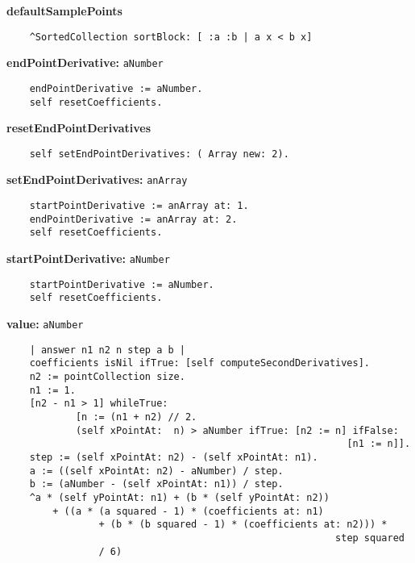 {\bf defaultSamplePoints}
\begin{verbatim}
    ^SortedCollection sortBlock: [ :a :b | a x < b x]

\end{verbatim}
{\bf endPointDerivative:} {\tt aNumber}
\begin{verbatim}
    endPointDerivative := aNumber.
    self resetCoefficients.

\end{verbatim}
{\bf resetEndPointDerivatives}
\begin{verbatim}
    self setEndPointDerivatives: ( Array new: 2).

\end{verbatim}
{\bf setEndPointDerivatives:} {\tt anArray}
\begin{verbatim}
    startPointDerivative := anArray at: 1.
    endPointDerivative := anArray at: 2.
    self resetCoefficients.

\end{verbatim}
{\bf startPointDerivative:} {\tt aNumber}
\begin{verbatim}
    startPointDerivative := aNumber.
    self resetCoefficients.

\end{verbatim}
{\bf value:} {\tt aNumber}
\begin{verbatim}
    | answer n1 n2 n step a b |
    coefficients isNil ifTrue: [self computeSecondDerivatives].
    n2 := pointCollection size.
    n1 := 1.
    [n2 - n1 > 1] whileTrue: 
            [n := (n1 + n2) // 2.
            (self xPointAt:  n) > aNumber ifTrue: [n2 := n] ifFalse: 
                                                           [n1 := n]].
    step := (self xPointAt: n2) - (self xPointAt: n1).
    a := ((self xPointAt: n2) - aNumber) / step.
    b := (aNumber - (self xPointAt: n1)) / step.
    ^a * (self yPointAt: n1) + (b * (self yPointAt: n2)) 
        + ((a * (a squared - 1) * (coefficients at: n1) 
                + (b * (b squared - 1) * (coefficients at: n2))) * 
                                                         step squared 
                / 6)

\end{verbatim}

